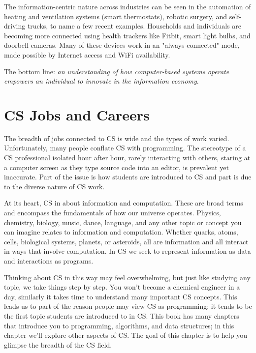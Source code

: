 The information-centric nature across industries can be seen in the automation of heating and ventilation systems (smart thermostats), robotic surgery, and self-driving trucks, to name a few recent examples. Households and individuals are becoming more connected using health trackers like Fitbit, smart light bulbs, and doorbell cameras. Many of these devices work in an "always connected" mode, made possible by Internet access and WiFi availability.

The bottom line: \emph{an understanding of how computer-based systems operate empowers an individual to innovate in the information economy}.  


\section{CS Jobs and Careers}

The breadth of jobs connected to CS is wide and the types of work varied. Unfortunately, many people conflate CS with programming. The stereotype of a CS professional isolated hour after hour, rarely interacting with others, staring at a computer screen as they type source code into an editor, is prevalent yet inaccurate. Part of the issue is how students are introduced to CS and part is due to the diverse nature of CS work.

At its heart, CS in about information and computation. These are broad terms and encompass the fundamentals of how our universe operates. Physics, chemistry, biology, music, dance, language, and any other topic or concept you can imagine relates to information and computation. Whether quarks, atoms, cells, biological systems, planets, or asteroids, all are information and all interact in ways that involve computation. In CS we seek to represent information as data and interactions as programs.

Thinking about CS in this way may feel overwhelming, but just like studying any topic, we take things step by step. You won't become a chemical engineer in a day, similarly it takes time to understand many important CS concepts. This leads us to part of the reason people may view CS as programming; it tends to be the first topic students are introduced to in CS. This book has many chapters that introduce you to programming, algorithms, and data structures; in this chapter we'll explore other aspects of CS. The goal of this chapter is to help you glimpse the breadth of the CS field.


